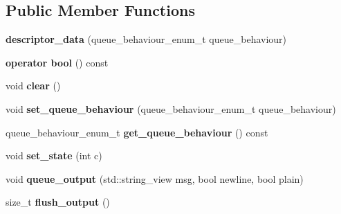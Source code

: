 \subsection*{Public Member Functions}
\begin{DoxyCompactItemize}
\item 
\mbox{\label{structmods_1_1descriptor__data_a3c66c2a608301363b9a7ec69de34daa2}} 
{\bfseries descriptor\+\_\+data} (queue\+\_\+behaviour\+\_\+enum\+\_\+t queue\+\_\+behaviour)
\item 
\mbox{\label{structmods_1_1descriptor__data_a9c33cb6ec96e34449799f3732cc52be5}} 
{\bfseries operator bool} () const
\item 
\mbox{\label{structmods_1_1descriptor__data_a79c88c03fa6ef091baebf1c61b1e7b34}} 
void {\bfseries clear} ()
\item 
\mbox{\label{structmods_1_1descriptor__data_ad00a992930095713a62a9ffa96cded3b}} 
void {\bfseries set\+\_\+queue\+\_\+behaviour} (queue\+\_\+behaviour\+\_\+enum\+\_\+t queue\+\_\+behaviour)
\item 
\mbox{\label{structmods_1_1descriptor__data_a6313447ef708b5f9880a575e44db1138}} 
queue\+\_\+behaviour\+\_\+enum\+\_\+t {\bfseries get\+\_\+queue\+\_\+behaviour} () const
\item 
\mbox{\label{structmods_1_1descriptor__data_ac6f3112269b959fc86169e7dcddc2634}} 
void {\bfseries set\+\_\+state} (int c)
\item 
\mbox{\label{structmods_1_1descriptor__data_ad0c494eaeed6840dbacfb89db8c3ae0c}} 
void {\bfseries queue\+\_\+output} (std\+::string\+\_\+view msg, bool newline, bool plain)
\item 
\mbox{\label{structmods_1_1descriptor__data_af3632d40818506148b103d562785043c}} 
size\+\_\+t {\bfseries flush\+\_\+output} ()
\end{DoxyCompactItemize}
